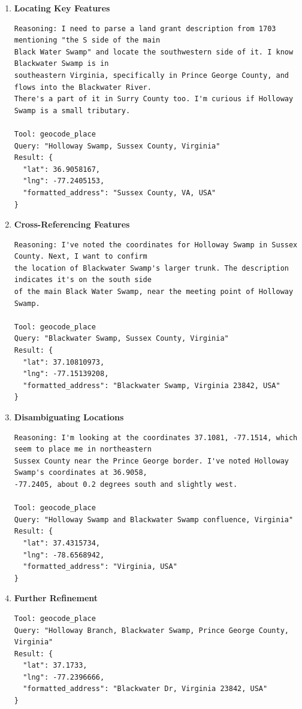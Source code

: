 \documentclass[
  10pt]{article}
\begin{document}
\begin{enumerate}
\def\labelenumi{\arabic{enumi}.}
\item
  \textbf{Locating Key Features}

\begin{lstlisting}
Reasoning: I need to parse a land grant description from 1703 mentioning "the S side of the main 
Black Water Swamp" and locate the southwestern side of it. I know Blackwater Swamp is in 
southeastern Virginia, specifically in Prince George County, and flows into the Blackwater River. 
There's a part of it in Surry County too. I'm curious if Holloway Swamp is a small tributary.

Tool: geocode_place
Query: "Holloway Swamp, Sussex County, Virginia"
Result: {
  "lat": 36.9058167, 
  "lng": -77.2405153, 
  "formatted_address": "Sussex County, VA, USA"
}
\end{lstlisting}
\item
  \textbf{Cross-Referencing Features}

\begin{lstlisting}
Reasoning: I've noted the coordinates for Holloway Swamp in Sussex County. Next, I want to confirm 
the location of Blackwater Swamp's larger trunk. The description indicates it's on the south side 
of the main Black Water Swamp, near the meeting point of Holloway Swamp.

Tool: geocode_place
Query: "Blackwater Swamp, Sussex County, Virginia"
Result: {
  "lat": 37.10810973, 
  "lng": -77.15139208, 
  "formatted_address": "Blackwater Swamp, Virginia 23842, USA"
}
\end{lstlisting}
\item
  \textbf{Disambiguating Locations}

\begin{lstlisting}
Reasoning: I'm looking at the coordinates 37.1081, -77.1514, which seem to place me in northeastern 
Sussex County near the Prince George border. I've noted Holloway Swamp's coordinates at 36.9058, 
-77.2405, about 0.2 degrees south and slightly west.

Tool: geocode_place
Query: "Holloway Swamp and Blackwater Swamp confluence, Virginia"
Result: {
  "lat": 37.4315734, 
  "lng": -78.6568942, 
  "formatted_address": "Virginia, USA"
}
\end{lstlisting}
\item
  \textbf{Further Refinement}

\begin{lstlisting}
Tool: geocode_place
Query: "Holloway Branch, Blackwater Swamp, Prince George County, Virginia"
Result: {
  "lat": 37.1733, 
  "lng": -77.2396666, 
  "formatted_address": "Blackwater Dr, Virginia 23842, USA"
}


\end{lstlisting}
\end{enumerate}
\end{document}
